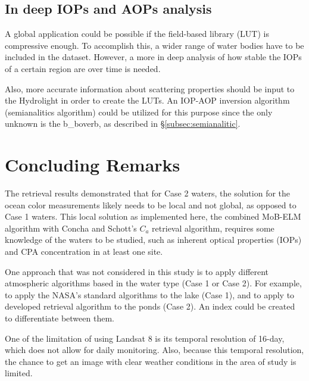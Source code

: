 \subsection{In deep IOPs and AOPs analysis}
A global application could be possible if the field-based library (LUT) is compressive enough. To accomplish this, a wider range of water bodies have to be included in the dataset. However, a more in deep analysis of how stable the IOPs of a certain region are over time is needed. 

Also, more accurate information about scattering properties should be input to the Hydrolight in order to create the LUTs. An IOP-AOP inversion algorithm (semianalitics algorithm) could be utilized for this purpose since the only unknown is the \gls{b_boverb}, as described in \S\ref{subsec:semianalitic}.

\section{Concluding Remarks}
The retrieval results demonstrated that for Case 2 waters, the solution for the ocean color measurements likely needs to be local and not global, as opposed to Case 1 waters. This local solution as implemented here, the combined MoB-ELM algorithm with Concha and Schott's $C_a$ retrieval algorithm, requires some knowledge of the waters to be studied, such as inherent optical properties (IOPs) and CPA concentration in at least one site.

One approach that was not considered in this study is to apply different atmospheric algorithms based in the water type (Case 1 or Case 2). For example, to apply the NASA's standard algorithms to the lake (Case 1), and to apply to developed retrieval algorithm to the ponds (Case 2). An index could be created to differentiate between them.

One of the limitation of using Landsat 8 is its temporal resolution of 16-day, which does not allow for daily monitoring. Also, because this temporal resolution, the chance to get an image with clear weather conditions in the area of study is limited.

